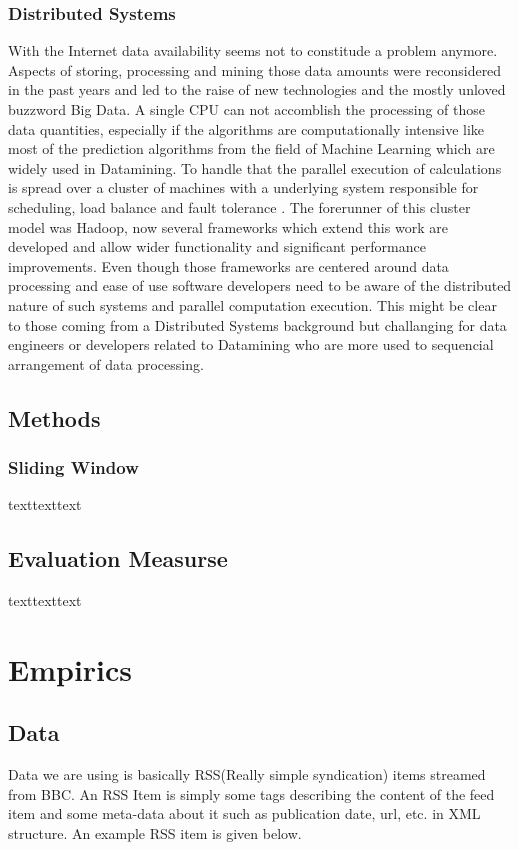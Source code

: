 \documentclass[12pt]{article}
\begin{document}
\subsubsection{Distributed Systems}
With the Internet data availability seems not to constitude a problem anymore. Aspects of storing, processing and mining those data amounts were reconsidered in the past years and led to the raise of new technologies and the mostly unloved buzzword Big Data. A single CPU can not accomblish the processing of those data quantities, especially if the algorithms are computationally intensive like most of the prediction algorithms from the field of Machine Learning which are widely used in Datamining. To handle that  the parallel execution of calculations is spread over a cluster of machines with a underlying system responsible for scheduling, load balance and fault tolerance \citep[p. 10]{zaharia2010} . The forerunner of this cluster model was Hadoop, now several frameworks which extend this work are developed and allow wider functionality and significant performance improvements. Even though those frameworks are centered around data processing and ease of use software developers need to be aware of the distributed nature of such systems and parallel computation execution. This might be clear to those coming from a Distributed Systems background but challanging for data engineers or developers related to Datamining who are more used to sequencial arrangement of data processing.  

\subsection{Methods}
\subsubsection{Sliding Window}
texttexttext

\subsection{Evaluation Measurse}
texttexttext

\section{Empirics}
\subsection{Data}
Data we are using is basically RSS(Really simple syndication) items streamed from BBC. An RSS Item is simply some tags describing the content of the feed item and some meta-data about it such as publication date, url, etc. in XML structure. An example RSS item is given below.
\end{document}

